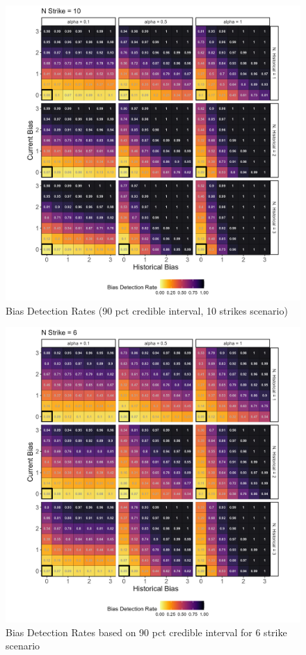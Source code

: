 \documentclass[12pt]{article}
\begin{document}
\begin{figure}

{\centering \includegraphics[width=0.95\linewidth]{../figures/pp10_90CI} 

}

\caption{Bias Detection Rates (90 pct credible interval, 10 strikes scenario)}\label{fig:figbd9010}
\end{figure}

\begin{figure}

{\centering \includegraphics[width=0.95\linewidth]{../figures/pp6_90CI} 

}

\caption{Bias Detection Rates based on 90 pct credible interval for 6 strike scenario}\label{fig:figbd906}
\end{figure}
\end{document}
